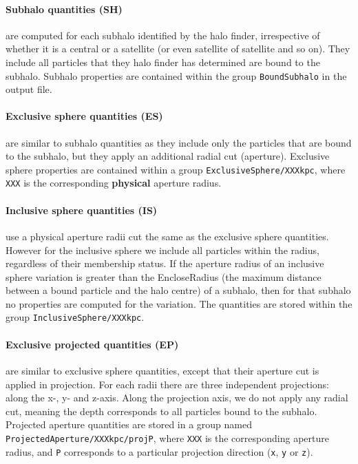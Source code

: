\documentclass{article}
\begin{document}
\paragraph{Subhalo quantities (SH)} are computed for each subhalo identified by the halo finder, irrespective of whether 
it is a central or a satellite (or even satellite of satellite and so on). They include all particles
that they halo finder has determined are bound to the subhalo. Subhalo properties are contained within the group 
\verb+BoundSubhalo+ in the output file.

\paragraph{Exclusive sphere quantities (ES)} are similar to subhalo quantities as they include only the 
particles that are bound to the subhalo, but they apply an additional radial cut (aperture). Exclusive sphere 
properties are contained within a group \verb+ExclusiveSphere/XXXkpc+, where 
\verb+XXX+ is the corresponding \textbf{physical} aperture radius.

\paragraph{Inclusive sphere quantities (IS)} use a physical aperture radii cut the same as the exclusive sphere 
quantities. However for the inclusive sphere we include all particles within the radius, regardless of their 
membership status. If the aperture radius of an inclusive sphere variation is greater than the EncloseRadius
(the maximum distance between a bound particle and the halo centre) of a subhalo, then for that subhalo no
properties are computed for the variation.
The quantities are stored within the group \verb+InclusiveSphere/XXXkpc+. 

\paragraph{Exclusive projected quantities (EP)} are similar to exclusive sphere quantities, except that their 
aperture cut is applied in projection. For each radii there are three  independent projections: along the 
x-, y- and z-axis. Along the projection axis, we do not apply any radial cut, meaning the depth corresponds to all particles 
bound to the subhalo. Projected aperture quantities are stored in a group named 
\verb+ProjectedAperture/XXXkpc/projP+, where \verb+XXX+ is the corresponding aperture radius, and \verb+P+ 
corresponds to a particular projection direction (\verb+x+, \verb+y+ or \verb+z+).
\end{document}

